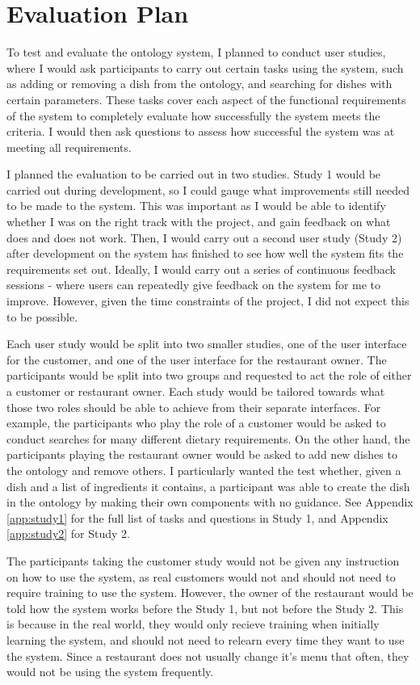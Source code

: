 \section{Evaluation Plan}

To test and evaluate the ontology system, I planned to conduct user studies, where I would ask participants to carry out certain tasks using the system, such as adding or removing a dish from the ontology, and searching for dishes with certain parameters. These tasks cover each aspect of the functional requirements of the system to completely evaluate how successfully the system meets the criteria. I would then ask questions to assess how successful the system was at meeting all requirements.

I planned the evaluation to be carried out in two studies. Study 1 would be carried out during development, so I could gauge what improvements still needed to be made to the system. This was important as I would be able to identify whether I was on the right track with the project, and gain feedback on what does and does not work. Then, I would carry out a second user study (Study 2) after development on the system has finished to see how well the system fits the requirements set out. Ideally, I would carry out a series of continuous feedback sessions - where users can repeatedly give feedback on the system for me to improve. However, given the time constraints of the project, I did not expect this to be possible.

Each user study would be split into two smaller studies, one of the user interface for the customer, and one of the user interface for the restaurant owner. The participants would be split into two groups and requested to act the role of either a customer or restaurant owner. Each study would be tailored towards what those two roles should be able to achieve from their separate interfaces. For example, the participants who play the role of a customer would be asked to conduct searches for many different dietary requirements. On the other hand, the participants playing the restaurant owner would be asked to add new dishes to the ontology and remove others. I particularly wanted the test whether, given a dish and a list of ingredients it contains, a participant was able to create the dish in the ontology by making their own components with no guidance. See Appendix \ref{app:study1} for the full list of tasks and questions in Study 1, and Appendix \ref{app:study2} for Study 2.

The participants taking the customer study would not be given any instruction on how to use the system, as real customers would not and should not need to require training to use the system. However, the owner of the restaurant would be told how the system works before the Study 1, but not before the Study 2. This is because in the real world, they would only recieve training when initially learning the system, and should not need to relearn every time they want to use the system. Since a restaurant does not usually change it's menu that often, they would not be using the system frequently.

